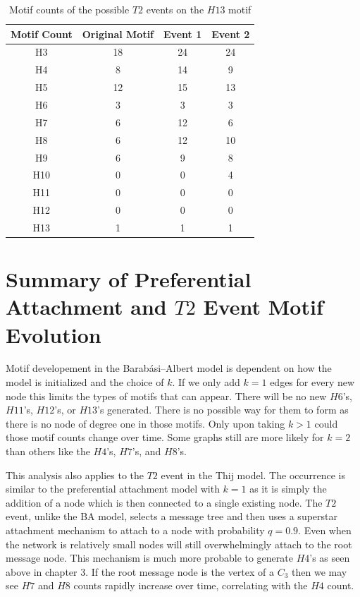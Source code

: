\begin{table}
    \centering
    \begin{tabular}{||c c c c||} 
    \hline
    Motif Count & Original Motif & Event 1 & Event 2 \\ [0.5ex] 
    \hline\hline
    H3 & 18 & 24 & 24\\ 
    \hline
    H4 & 8 & 14 & 9  \\
    \hline
    H5 & 12 & 15 & 13  \\
    \hline
    H6 & 3 & 3 &3  \\
    \hline
    H7 & 6 & 12 & 6 \\
    \hline
    H8 & 6 & 12 & 10\\
    \hline
    H9 & 6 & 9 & 8 \\
    \hline
    H10 & 0 & 0 & 4  \\
    \hline
    H11 & 0 & 0 & 0  \\
    \hline
    H12 & 0 & 0 & 0 \\
    \hline
    H13 & 1 & 1 & 1 \\
    \hline
   \end{tabular}
   \caption{Motif counts of the possible $T2$ events on the $H13$ motif}
   \label{table:11}
\end{table}

\section{Summary of Preferential Attachment and $T2$ Event Motif Evolution}


Motif developement in the Barabási–Albert model is dependent on how the model is initialized and 
the choice of $k$. If we only add $k=1$ edges for every new node
this limits the types of motifs that can appear. There will be no new $H6$'s, $H11$'s,
$H12$'s, or $H13$'s generated. There is no possible way for them to form as there is no
node of degree one in those motifs. Only upon taking $k>1$ could those motif counts change over
 time. Some graphs still are more likely for $k=2$ than others like the $H4$'s, $H7$'s, and $H8$'s.

This analysis also applies to the $T2$ event in the Thij model. The occurrence is similar to
the preferential attachment model with $k=1$ as it is simply the addition of a node which is then
connected to a single existing node. The $T2$ event, unlike the BA model, selects a message tree 
and then uses a superstar attachment mechanism to attach to a node with probability $q=0.9$. Even when the network is relatively
small nodes will still overwhelmingly attach to the root message node. This mechanism is
much more probable to generate $H4$'s as seen above in chapter 3. If the root
message node is the vertex of a $C_3$ then we may see $H7$ and $H8$ counts
rapidly increase over time, correlating with the $H4$ count. 

